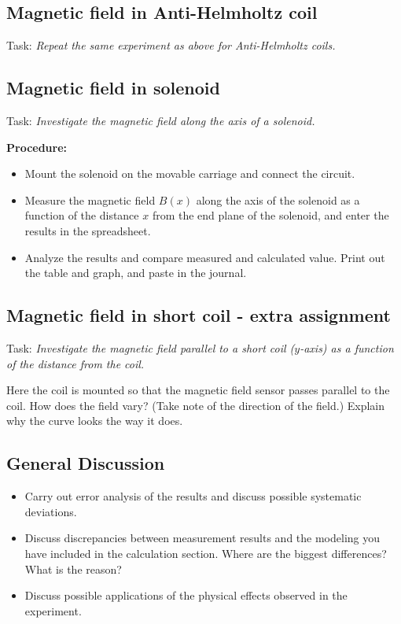 \documentclass[../Elmag-labhefte-2020.tex]{subfiles}
\begin{document}
\subsection{Magnetic field in Anti-Helmholtz coil}

Task:
\emph{Repeat the same experiment as above for Anti-Helmholtz coils.}

\subsection{Magnetic field in solenoid}

Task:
\emph{Investigate the magnetic field along the axis of a solenoid.}

\textbf{Procedure:}
\begin{itemize}
    \item Mount the solenoid on the movable carriage and connect the circuit.
    \item Measure the magnetic field $B(x)$ along the axis of the solenoid as a function of the distance $x$ from the end plane of the solenoid, and enter the results in the spreadsheet.
    \item Analyze the results and compare measured and calculated value. Print out the table and graph, and paste in the journal.
\end{itemize}

\subsection{Magnetic field in short coil - extra assignment}

Task:
\emph{Investigate the magnetic field parallel to a short coil ($y$-axis) as a function of the distance from the coil.}
 

Here the coil is mounted so that the magnetic field sensor passes parallel to the coil. How does the field vary? (Take note of the direction of the field.) Explain why the curve looks the way it does.

\subsection{General Discussion}

\begin{itemize}
   \item Carry out error analysis of the results and discuss possible systematic deviations.
   \item Discuss discrepancies between measurement results and the modeling you have included in the calculation section. Where are the biggest differences? What is the reason?
    \item Discuss possible applications of the physical effects observed in the experiment.
\end{itemize}
\end{document}
